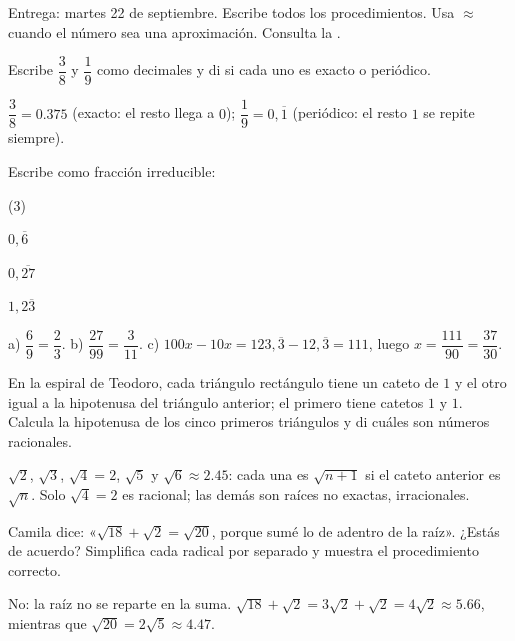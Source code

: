 \documentclass[11pt]{article}
\begin{document}
\encabezado

\begin{instrucciones}
Entrega: martes 22 de septiembre. Escribe todos los procedimientos. Usa $\approx$ cuando
el número sea una aproximación. Consulta la .
\end{instrucciones}

\begin{preguntas}

\pregunta Escribe $\dfrac{3}{8}$ y $\dfrac{1}{9}$ como decimales y di si cada uno es
exacto o periódico.
\begin{solucion}[2.5cm]
$\dfrac{3}{8} = \num{0,375}$ (exacto: el resto llega a $0$);
$\dfrac{1}{9} = 0{,}\overline{1}$ (periódico: el resto $1$ se repite siempre).
\end{solucion}

\pregunta Escribe como fracción irreducible:
\begin{opciones*}(3)
  \item $0{,}\overline{6}$
  \item $0{,}\overline{27}$
  \item $1{,}2\overline{3}$
\end{opciones*}
\begin{solucion}[3.5cm]
a) $\dfrac{6}{9} = \dfrac{2}{3}$. \quad b) $\dfrac{27}{99} = \dfrac{3}{11}$. \quad
c) $100x - 10x = 123{,}\overline{3} - 12{,}\overline{3} = 111$, luego
$x = \dfrac{111}{90} = \dfrac{37}{30}$.
\end{solucion}

\pregunta En la espiral de Teodoro, cada triángulo rectángulo tiene un cateto de $1$ y el
otro igual a la hipotenusa del triángulo anterior; el primero tiene catetos $1$ y $1$.
Calcula la hipotenusa de los cinco primeros triángulos y di cuáles son números
racionales.
\begin{solucion}[3.5cm]
$\sqrt{2}$, $\sqrt{3}$, $\sqrt{4} = 2$, $\sqrt{5}$ y $\sqrt{6} \approx \num{2,45}$: cada
una es $\sqrt{n + 1}$ si el cateto anterior es $\sqrt{n}$. Solo $\sqrt{4} = 2$ es
racional; las demás son raíces no exactas, irracionales.
\end{solucion}

\pregunta Camila dice: «$\sqrt{18} + \sqrt{2} = \sqrt{20}$, porque sumé lo de adentro de
la raíz». ¿Estás de acuerdo? Simplifica cada radical por separado y muestra el
procedimiento correcto.
\begin{solucion}[3cm]
No: la raíz no se reparte en la suma.
$\sqrt{18} + \sqrt{2} = 3\sqrt{2} + \sqrt{2} = 4\sqrt{2} \approx \num{5,66}$, mientras que
$\sqrt{20} = 2\sqrt{5} \approx \num{4,47}$.
\end{solucion}


\end{preguntas}
\end{document}
